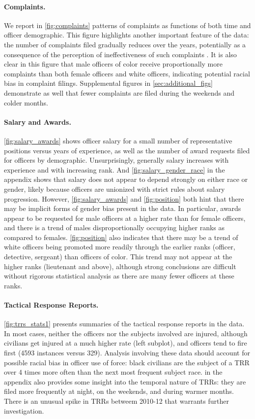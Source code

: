 \paragraph{Complaints.} 
We report in \cref{fig:complaints} patterns of complaints as functions of both time
and officer demographic. This figure highlights another important feature of the data: 
the number of complaints filed gradually reduces over the years, potentially as a 
consequence of the perception of ineffectiveness of such complaints \cite{xx}.
It is also clear in this figure that male officers of color receive proportionally more complaints
than both female officers and white officers, indicating potential racial bias in complaint filings.
Supplemental figures in \cref{sec:additional_figs} demonstrate as well that fewer complaints are 
filed during the weekends and colder months.

\paragraph{Salary and Awards.} \cref{fig:salary_awards} shows officer salary for a small number of representative
positions versus years of experience, as well as the number of award requests filed for officers by demographic.
Unsurprisingly, generally salary increases with experience and with increasing rank. 
And \cref{fig:salary_gender_race} in the appendix shows that salary does not appear to depend strongly on either race or gender,
likely because officers are unionized with strict rules about salary progression.
However, \cref{fig:salary_awards} and \cref{fig:position} both hint that there may be implicit forms of gender
bias present in the data. In particular, awards appear to be requested for male officers at a higher rate than for female officers,
and there is a trend of males disproportionally occupying higher ranks as compared to females.
\cref{fig:position} also indicates that there may be a trend of white officers being promoted more readily 
through the earlier ranks (officer, detective, sergeant) than officers of color.
This trend may not appear at the higher ranks (lieutenant and above), although strong conclusions are difficult without 
rigorous statistical analysis as there are many fewer officers at these ranks.

\paragraph{Tactical Response Reports.}
\cref{fig:trrs_stats1} presents summaries of the tactical response reports in the data.
 In most cases, neither the officers nor the
subjects involved are injured, although civilians get injured at a much higher
rate (left subplot), and officers tend to fire first (4593 instances versus 329).
Analysis involving these data should account for possible racial bias in officer use of force: 
black civilians are the subject of a TRR over 4 times more often than the next 
most frequent subject race. 
 in the appendix also provides some 
insight into the temporal nature of TRRs: they are filed more frequently 
at night, on the weekends, and during warmer months. 
There is an unusual spike in TRRs betweem 2010-12 that warrants further investigation.


